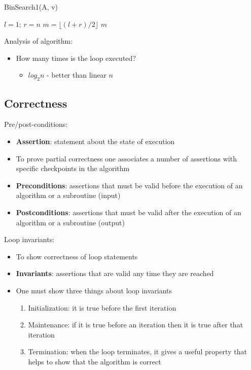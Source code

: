 \begin{center}
\begin{minipage}{0.6\textwidth}
\begin{algorithm}[H]
\caption{BinSearch1(A, v)}
$l = 1$; $r = n$\;
$m = \lfloor (l + r) / 2 \rfloor$\;
 {
    \Return $m$\;
}
\end{algorithm}
\end{minipage}

\end{center}

Analysis of algorithm:
\begin{itemize}
    \item How many times is the loop executed?
    \begin{itemize}
        \item $log_2n$ - better than linear $n$
    \end{itemize}
\end{itemize}

\subsection{Correctness}

Pre/post-conditions:
\begin{itemize}
    \item \textbf{Assertion}: statement about the state of execution
    \item To prove partial correctness one associates a number of assertions with specific checkpoints in the algorithm
    \item \textbf{Preconditions}: assertions that must be valid before the execution of an algorithm or a subroutine (input)
    \item \textbf{Postconditions}: assertions that must be valid after the execution of an algorithm or a subroutine (output)
\end{itemize}
Loop invariants:
\begin{itemize}
    \item To show correctness of loop statements
    \item \textbf{Invariants}: assertions that are valid any time they are reached
    \item One must show three things about loop invariants 
    \begin{enumerate}
        \item Initialization: it is true before the first iteration
        \item Maintenance: if it is true before an iteration then it is true after that iteration
        \item Termination: when the loop terminates, it gives a useful property that helps to show that the algorithm is correct 
    \end{enumerate}
\end{itemize}

